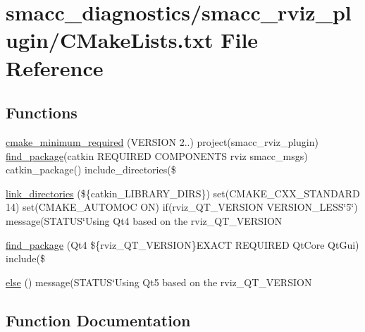 \hypertarget{smacc__diagnostics_2smacc__rviz__plugin_2CMakeLists_8txt}{}\section{smacc\+\_\+diagnostics/smacc\+\_\+rviz\+\_\+plugin/\+C\+Make\+Lists.txt File Reference}
\label{smacc__diagnostics_2smacc__rviz__plugin_2CMakeLists_8txt}
\subsection*{Functions}
\begin{DoxyCompactItemize}
\item 
\hyperlink{smacc__diagnostics_2smacc__rviz__plugin_2CMakeLists_8txt_ad9e57435a24b91a1979cf7ff73ede5c5}{cmake\+\_\+minimum\+\_\+required} (V\+E\+R\+S\+I\+ON 2..) project(smacc\+\_\+rviz\+\_\+plugin) \hyperlink{smacc__diagnostics_2smacc__rviz__plugin_2CMakeLists_8txt_a5d330dd815911acbe5c9e4f38ca83f28}{find\+\_\+package}(catkin R\+E\+Q\+U\+I\+R\+ED C\+O\+M\+P\+O\+N\+E\+N\+TS rviz smacc\+\_\+msgs) catkin\+\_\+package() include\+\_\+directories(\$
\item 
\hyperlink{smacc__diagnostics_2smacc__rviz__plugin_2CMakeLists_8txt_a018f1c9f30e6e8a16e3c266013e4b7fc}{link\+\_\+directories} (\$\{catkin\+\_\+\+L\+I\+B\+R\+A\+R\+Y\+\_\+\+D\+I\+RS\}) set(C\+M\+A\+K\+E\+\_\+\+C\+X\+X\+\_\+\+S\+T\+A\+N\+D\+A\+RD 14) set(C\+M\+A\+K\+E\+\_\+\+A\+U\+T\+O\+M\+OC ON) if(rviz\+\_\+\+Q\+T\+\_\+\+V\+E\+R\+S\+I\+ON V\+E\+R\+S\+I\+O\+N\+\_\+\+L\+E\+SS\char`\"{}5\char`\"{}) message(S\+T\+A\+T\+US\char`\"{}Using Qt4 based on the rviz\+\_\+\+Q\+T\+\_\+\+V\+E\+R\+S\+I\+ON
\item 
\hyperlink{smacc__diagnostics_2smacc__rviz__plugin_2CMakeLists_8txt_a5d330dd815911acbe5c9e4f38ca83f28}{find\+\_\+package} (Qt4 \$\{rviz\+\_\+\+Q\+T\+\_\+\+V\+E\+R\+S\+I\+ON\}E\+X\+A\+CT R\+E\+Q\+U\+I\+R\+ED Qt\+Core Qt\+Gui) include(\$
\item 
\hyperlink{smacc__diagnostics_2smacc__rviz__plugin_2CMakeLists_8txt_a75c2360b79be3c17d9759b7054338240}{else} () message(S\+T\+A\+T\+US\char`\"{}Using Qt5 based on the rviz\+\_\+\+Q\+T\+\_\+\+V\+E\+R\+S\+I\+ON
\end{DoxyCompactItemize}


\subsection{Function Documentation}
